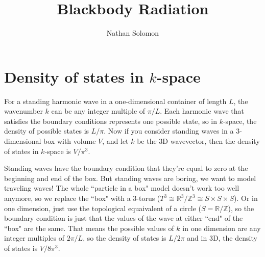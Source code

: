 \documentclass[12pt]{article}
\begin{document}
\title{Blackbody Radiation}
\author{Nathan Solomon}
\maketitle

\section{Density of states in $k$-space}
For a standing harmonic wave in a one-dimensional container of length $L$, the wavenumber $k$ can be any integer multiple of $\pi/L$. Each harmonic wave that satisfies the boundary conditions represents one possible state, so in $k$-space, the density of possible states is $L/\pi$. Now if you consider standing waves in a 3-dimensional box with volume $V$, and let $k$ be the 3D wavevector, then the density of states in $k$-space is $V/\pi^3$.

Standing waves have the boundary condition that they're equal to zero at the beginning and end of the box. But standing waves are boring, we want to model traveling waves! The whole ``particle in a box" model doesn't work too well anymore, so we replace the ``box" with a 3-torus ($T^3 \cong \mathbb{R}^3 / \mathbb{Z}^3 \cong S \times S \times S$). Or in one dimension, just use the topological equaivalent of a circle ($S = \mathbb{R} / \mathbb{Z}$), so the boundary condition is just that the values of the wave at either ``end" of the ``box" are the same. That means the possible values of $k$ in one dimension are any integer multiples of $2 \pi / L$, so the density of states is $L / 2 \pi$ and in 3D, the density of states is $V / 8 \pi^3$.
\end{document}
